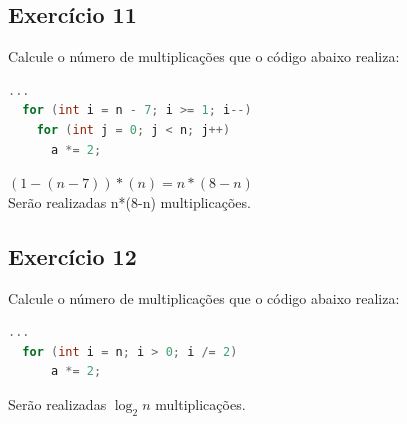 \documentclass[12pt]{article}
\begin{document}
\subsection{Exercício 11}
Calcule o número de multiplicações que o código abaixo realiza:
\begin{lstlisting}[language=C]
  ...
  for (int i = n - 7; i >= 1; i--)
    for (int j = 0; j < n; j++)
      a *= 2;

\end{lstlisting}
$(1 - (n - 7)) * (n) = n * (8 - n)$\\
Serão realizadas n*(8-n) multiplicações.

\subsection{Exercício 12}
Calcule o número de multiplicações que o código abaixo realiza:
\begin{lstlisting}[language=C]
  ...
  for (int i = n; i > 0; i /= 2)
      a *= 2;

\end{lstlisting}
Serão realizadas $\log_{2}{n}$ multiplicações.



\end{document}
